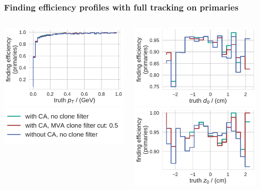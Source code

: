 \documentclass[18pt, aspectratio=169]{beamer}
\begin{document}
\begin{frame}
  \frametitle{Finding efficiency profiles with full tracking on primaries}
  \begin{columns}
    \begin{column}{.5\textwidth}
      \includegraphics[width=.7\textwidth]{figures/findeff_by_pt_truth_fullreco.pdf}\\
      \includegraphics[width=.7\textwidth]{figures/legend_fom_profile.pdf}\\
    \end{column}    
    \begin{column}{.5\textwidth}
      \includegraphics[width=.7\textwidth]{figures/findeff_by_d0_truth_fullreco.pdf}\\
      \includegraphics[width=.7\textwidth]{figures/findeff_by_z0_truth_fullreco.pdf}
    \end{column}
  \end{columns}
\end{frame}
\end{document}
